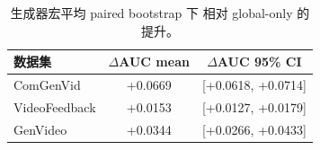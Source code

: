 \begin{table}[!t]
  \centering
  \caption{生成器宏平均 paired bootstrap 下 \method 相对 global-only 的提升。}
  \label{tab:bootstrap_delta}
  \begin{tabular}{lcc}
    \toprule
    数据集 & $\Delta$AUC mean & $\Delta$AUC 95\% CI \\
    \midrule
    ComGenVid & +0.0669 & [+0.0618, +0.0714] \\
    VideoFeedback & +0.0153 & [+0.0127, +0.0179] \\
    GenVideo & +0.0344 & [+0.0266, +0.0433] \\
    \bottomrule
  \end{tabular}
\end{table}
